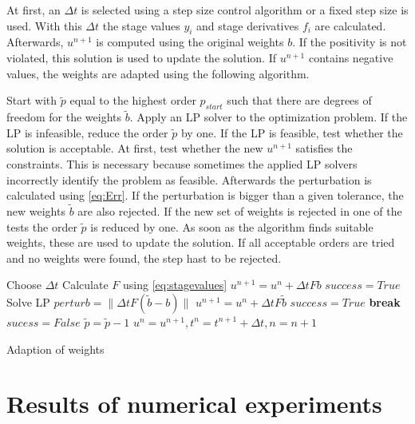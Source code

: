\documentclass[a4paper]{article}
\numberwithin{equation}{section}
\theoremstyle{plain}
\theoremstyle{definition}
\numberwithin{theorem}{section}
\newcommand{\dt}{{\Delta t}}
\newcommand{\1}{\mathbbm{1}}
\newcommand{\bt}{\tilde{b}}
\begin{document}
At first, an $\dt$ is selected using a step size control algorithm or a fixed step size is used.
With this $\dt$ the stage values $y_i$ and stage derivatives $f_i$ are calculated.
Afterwards, $u^{n+1}$ is computed using the original weights $b$.
If the positivity is not violated, this solution is used to update the solution.
If $u^{n+1}$ contains negative values, the weights are adapted using the following algorithm.

Start with $\tilde{p}$ equal to the highest order $p_{start}$ such that there are degrees of freedom for the weights $\bt$. 
Apply an LP solver to the optimization
problem.
If the LP is infeasible, reduce the order $\tilde p$ by one.
If the LP is feasible, test whether the solution is acceptable.
At first, test whether the new $u^{n+1}$ satisfies the constraints.
This is necessary because sometimes the applied LP solvers incorrectly
identify the problem as feasible.
Afterwards the perturbation is calculated using \eqref{eq:Err}.
If the perturbation is bigger than a given tolerance, the
new weights $\bt$ are also rejected.
If the new set of weights is rejected in one of the tests the order
$\tilde p$ is reduced by one.
As soon as the algorithm finds suitable weights, these are used to update the solution.
If all acceptable orders are tried and no weights were found, the step hast to be rejected.

\begin{algorithm}[ht]
\begin{algorithmic}[1]
\State Choose $\Delta t$
\State Calculate $F$ using \eqref{eq:stagevalues}
\State $u^{n+1}=u^n + \Delta t Fb$
	\State $success = True$
\Else
		\State Solve LP
			\State $perturb = \| \Delta t F(\tilde{b}-b)\|$
				\State $u^{n+1}=u^n+\Delta t F \tilde b$
				\State $success = True$ 
				\State \textbf{break}
			\EndIf 
		\EndIf
			\State $sucess=False$			
		\EndIf
		\State $\tilde p = \tilde p -1$
	\EndWhile
\EndIf 
{}
	\State $u^n=u^{n+1},t^n=t^{n+1}+\Delta t,n=n+1$
\EndIf
\EndWhile
\end{algorithmic}
\caption{Adaption of weights}
\label{alg:Adaption}
\end{algorithm}

\section{Results of numerical experiments}\label{sec:Numeric_Results}
\end{document}
